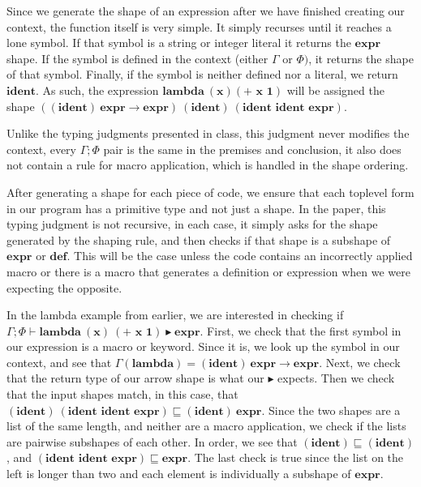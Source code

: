 \documentclass[11pt]{article}
\begin{document}
Since we generate the shape of an expression after we have finished creating our context, the function itself is very simple. It simply recurses until it reaches a lone symbol. If that symbol is a string or integer literal it returns the $\textbf{expr}$ shape. If the symbol is defined in the context (either $\Gamma$ or $\Phi)$, it returns the shape of that symbol. Finally, if the symbol is neither defined nor a literal, we return $\textbf{ident}$. As such, the expression $\textbf{lambda}\ (\textbf{x}) (\textbf{+ x 1})$ will be assigned the shape $((\textbf{ident})\ \textbf{expr} \rightarrow \textbf{expr})\ (\textbf{ident})\ (\textbf{ident ident expr})$. 

Unlike the typing judgments presented in class, this judgment never modifies the context, every $\Gamma;\Phi$ pair is the same in the premises and conclusion, it also does not contain a rule for macro application, which is handled in the shape ordering. 

After generating a shape for each piece of code, we ensure that each toplevel form in our program has a primitive type and not just a shape. In the paper, this typing judgment is not recursive, in each case, it simply asks for the shape generated by the shaping rule, and then checks if that shape is a subshape of $\textbf{expr}$ or $\textbf{def}$. This will be the case unless the code contains an incorrectly applied macro or there is a macro that generates a definition or expression when we were expecting the opposite. 

In the lambda example from earlier, we are interested in checking if $\Gamma; \Phi \vdash \textbf{lambda}\ (\textbf{x})\ (\textbf{+ x 1}) \blacktriangleright \textbf{expr}$. First, we check that the first symbol in our expression is a macro or keyword. Since it is, we look up the symbol in our context, and see that $\Gamma(\textbf{lambda}) = (\textbf{ident})\ \textbf{expr} \rightarrow \textbf{expr}$. Next, we check that the return type of our arrow shape is what our $\blacktriangleright$ expects. Then we check that the input shapes match, in this case, that $(\textbf{ident})\ (\textbf{ident ident expr}) \sqsubseteq (\textbf{ident})\ \textbf{expr}$. Since the two shapes are a list of the same length, and neither are a macro application, we check if the lists are pairwise subshapes of each other. In order, we see that $(\textbf{ident}) \sqsubseteq (\textbf{ident})$, and $(\textbf{ident ident expr}) \sqsubseteq \textbf{expr}$. The last check is true since the list on the left is longer than two and each element is individually a subshape of $\textbf{expr}$. 
\end{document}
